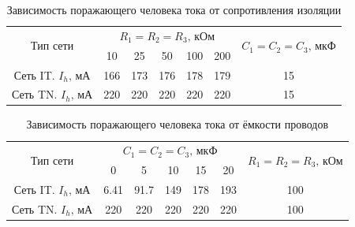 	\begin{table}[h]
		\begin{center}
		\begin{tabular}{|c|c|c|c|c|c|c|}
			\hline
			
			\multirow{2}{*}{Тип сети} & \multicolumn{5}{c|}{$R_1=R_2=R_3,\,\text{кОм}$} & \multirow{2}{*}{$C_1=C_2=C_3,\,\text{мкФ}$} \\
			\cline{2-6}
			& 10 & 25 & 50 & 100 & 200 & \\
			\hline
			Сеть IT. $I_h,\,\text{мА}$ & 166 & 173 & 176 & 178 & 179 & 15 \\
			\hline
			Сеть TN. $I_h,\,\text{мА}$ & 220 & 220 & 220 & 220 & 220 & 15 \\
			
			\hline
		\end{tabular}
		\end{center}
		\caption{Зависимость поражающего человека тока от сопротивления изоляции}
		\label{table_i(r)}
	\end{table}

	\begin{table}[h]
		\begin{center}
			\begin{tabular}{|c|c|c|c|c|c|c|}
				\hline
				
				\multirow{2}{*}{Тип сети} & \multicolumn{5}{c|}{$C_1=C_2=C_3,\,\text{мкФ}$} & \multirow{2}{*}{$R_1=R_2=R_3,\,\text{кОм}$} \\
				\cline{2-6}
				& 0 & 5 & 10 & 15 & 20 & \\
				\hline
				Сеть IT. $I_h,\,\text{мА}$ & 6.41 & 91.7 & 149 & 178 & 193 & 100 \\
				\hline
				Сеть TN. $I_h,\,\text{мА}$ & 220 & 220 & 220 & 220 & 220 & 100 \\
				
				\hline
			\end{tabular}
		\end{center}
		\caption{Зависимость поражающего человека тока от ёмкости проводов}
		\label{table_i(c)}
	\end{table}


